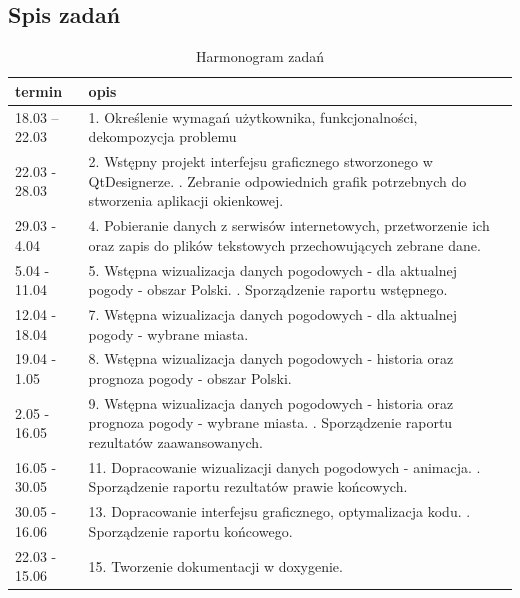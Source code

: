 \documentclass[10pt, a4paper]{article}
\begin{document}
\subsection{Spis zadań}
\begin{table}[!h]
	\centering
	\caption{Harmonogram zadań}
	\label{table_exres}
	\begin{tabular}{p{20mm}p{120mm}}
		\toprule
		termin & opis\\ \midrule
		18.03 -- 22.03 & 1. Określenie wymagań użytkownika, funkcjonalności, dekompozycja problemu  \\
		\midrule
		22.03 - 28.03 & 2. Wstępny projekt interfejsu graficznego stworzonego w QtDesignerze. \newline 3. Zebranie odpowiednich grafik potrzebnych do stworzenia aplikacji okienkowej.\\
		\midrule
	    29.03 - 4.04 & 4. Pobieranie danych z serwisów internetowych, przetworzenie ich oraz zapis do plików tekstowych przechowujących zebrane dane. \\
		\midrule
		 5.04 - 11.04 & 5. Wstępna wizualizacja danych pogodowych - dla aktualnej pogody - obszar Polski. \newline 6. Sporządzenie raportu wstępnego.\\
		 \midrule
        12.04 - 18.04 &  7. Wstępna wizualizacja danych pogodowych - dla aktualnej pogody - wybrane miasta.\\

		\midrule
        19.04 - 1.05 & 8. Wstępna wizualizacja danych pogodowych - historia oraz prognoza pogody - obszar Polski. \\ 

		\midrule
        2.05 - 16.05 & 9. Wstępna wizualizacja danych pogodowych - historia oraz prognoza pogody - wybrane miasta. \newline 10. Sporządzenie raportu rezultatów zaawansowanych. \\

		\midrule
        16.05 - 30.05 & 11. Dopracowanie wizualizacji danych pogodowych - animacja. \newline 12. Sporządzenie raportu rezultatów prawie końcowych. \\
        
        \midrule 
        30.05 - 16.06 & 13. Dopracowanie interfejsu graficznego, optymalizacja kodu. 
        \newline 14. Sporządzenie raportu końcowego. \\
        \midrule
        22.03 - 15.06 & 15. Tworzenie dokumentacji w doxygenie. \\

		\bottomrule
	\end{tabular}
\end{table}
\end{document}
